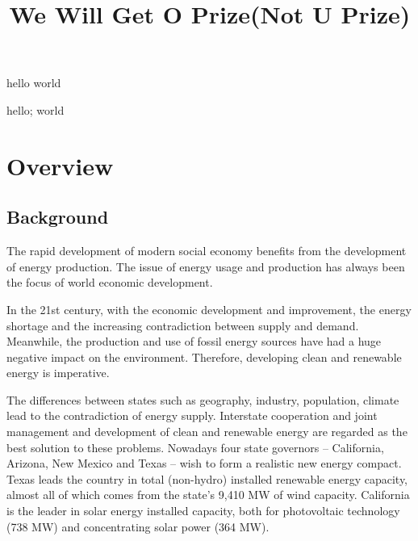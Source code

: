 \documentclass{mcmthesis}
\title{We Will Get O Prize(Not U Prize)}
\begin{document}
\begin{sheetsummary}
hello world
\end{sheetsummary}


\begin{keywords}
hello; world
\end{keywords}

\maketitle
\tableofcontents
\newpage

\section{Overview}
    \subsection{Background}
    The rapid development of modern social economy benefits from the development of energy production. The issue of energy usage and production has always been the focus of world economic development.

    In the 21st century, with the economic development and improvement, the energy shortage and the increasing contradiction between supply and demand. Meanwhile, the production and use of fossil energy sources have had a huge negative impact on the environment. Therefore, developing clean and renewable energy is imperative.

    The differences between states such as geography, industry, population, climate lead to the contradiction of energy supply.
    Interstate cooperation and joint management and development of clean and renewable energy are regarded as the best solution to these problems. Nowadays four state governors  – California, Arizona, New Mexico and Texas  –  wish to form a realistic new energy compact. Texas leads the country in total (non-hydro) installed renewable energy capacity, almost all of which comes from the state’s 9,410 MW of wind capacity. California is the leader in solar energy installed capacity, both for photovoltaic technology (738 MW) and concentrating solar power (364 MW).
\end{document}
